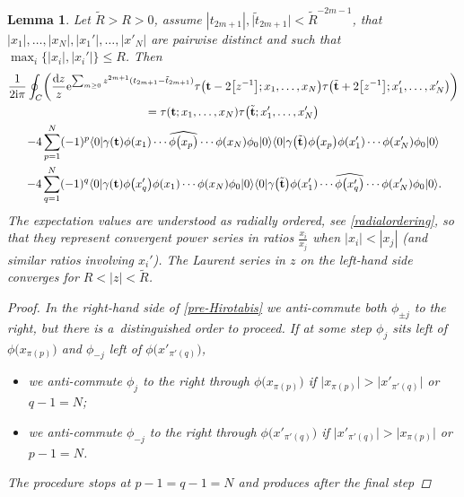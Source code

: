 \documentclass[pdftex]{sigma}
\numberwithin{equation}{section}
\newcommand{\dd}{\mathrm{d}}
\newtheorem{Lemma}[Theorem]{Lemma}
\begin{document}
\begin{Lemma}\label{lemmaRes}
Let $\tilde{R} >\! R >\! 0$, assume $|t_{2m+1}|,\bigl|\tilde{t}_{2m+1}\bigr|\!<\! \tilde{R}^{-2m-1}$, that $|x_1|,\dots,|x_N|,|x_1'|,\dots,|x'_N|$ are pairwise distinct and such that $\max_i\{|x_i|,|x_i'|\} \leq R$. Then
\begin{gather}
 \frac{1}{2{\rm i}\pi} \oint_{C} \biggl(\frac{\dd z}{z}
{\rm e}^{\sum_{m \geq 0} z^{2m+1}(t_{2m+1}-\tilde{t}_{2m+1})}
\tau\bigl(\mathbf{t}-2\bigl[z^{-1}\bigr];x_1,\dots,x_N\bigr)
\tau\bigl(\tilde{\mathbf{t}}+2\bigl[z^{-1}\bigr];x_1',\dots,x_N'\bigr)\biggr) \nonumber
\\
 =\tau(\mathbf{t};x_1,\dots,x_N)
\tau\bigl(\tilde{\mathbf{t}};x_1',\dots,x_N'\bigr) \nonumber
\\
 -4 \sum_{p=1}^N (-1)^p
\langle 0|\gamma(\mathbf{t}) \phi(x_1) \cdots \widehat{\phi\bigl(x_p\bigr)} \cdots
\phi(x_N) \phi_0|0\rangle
\langle 0|\gamma\bigl(\tilde{\mathbf{t}}\bigr) \phi\bigl(x_p\bigr) \phi(x_1')\cdots \phi(x_N')
\phi_0|0\rangle \nonumber
\\
 -4 \sum_{q=1}^N (-1)^q
\langle 0|\gamma(\mathbf{t}) \phi\bigl(x_q'\bigr)\phi(x_1)\cdots
\phi(x_N) \phi_0|0\rangle
\langle 0|\gamma\bigl(\tilde{\mathbf{t}}\bigr) \phi(x_1')
\cdots \widehat{\phi\bigl(x_q'\bigr)} \cdots \phi(x_N')
\phi_0|0\rangle.\!\label{pre-Hirota2}
\end{gather}
The expectation values are understood as radially
ordered, see \eqref{radialordering}, so that they represent convergent
power series in ratios $\frac{x_i}{x_j}$ when $|x_i|<|x_j|$
\big(and similar ratios involving $x_i'$\big). The Laurent series in $z$
on the left-hand side converges for $R < |z| <\tilde{R}$.
\begin{proof}
 In the right-hand side of \eqref{pre-Hirotabis}
 we anti-commute both $\phi_{\pm j}$ to the right, but there is
 a~distinguished order to proceed. If at some step $\phi_j$ sits left of
$\phi\bigl(x_{\pi(p)}\bigr)$ and
$\phi_{-j}$ left of $\phi\bigl(x'_{\pi'(q)}\bigr)$,
\begin{itemize}\itemsep=0pt
\item we anti-commute $\phi_j$ to the right through
$\phi\bigl(x_{\pi(p)}\bigr)$ if
$\bigl|x_{\pi(p)}\bigr|>\bigl|x'_{\pi'(q)}\bigr|$ or $q-1=N$;
\item we anti-commute $\phi_{-j}$ to the right
 through $\phi\bigl(x'_{\pi'(q)}\bigr)$ if
$\bigl|x'_{\pi'(q)}\bigr|>\bigl|x_{\pi(p)}\bigr|$ or $p-1=N$.
\end{itemize}
The procedure stops at $p{-}1=q{-}1=N$ and
produces after the final step

\end{proof}
\end{Lemma}
\end{document}
